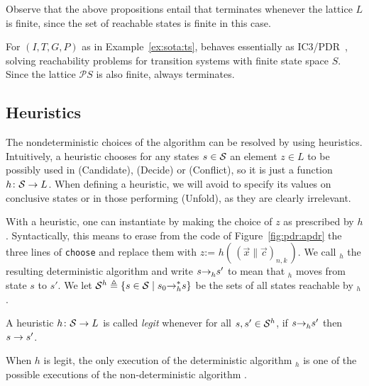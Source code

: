 Observe that the above propositions entail that {\APDR} terminates whenever the lattice $L$ is finite, since the set of reachable states is finite in this case.

\begin{example}
	For $(I,T,G,P)$ as in Example~\ref{ex:sota:ts}, {\APDR} behaves essentially as IC3/PDR~\cite{Bradley11}, solving reachability problems for transition systems with finite state space $S$. Since the lattice $\mathcal{P}S$ is also finite, {\APDR} always terminates.
\end{example}

\subsection{Heuristics}\label{sec:pdr:heuristics}
The nondeterministic choices of the algorithm can be resolved by using heuristics. Intuitively, a heuristic chooses for any states $s\in\mathcal{S}$ an element $z\in L$ to be possibly used in (Candidate), (Decide) or (Conflict), so it is just a function $h\colon \mathcal{S} \to L$.
When defining a heuristic, we will avoid to specify its values on conclusive states or in those performing (Unfold), as they are clearly irrelevant.

With a heuristic, one can instantiate {\APDR} by making the choice of $z$ as prescribed by $h$. Syntactically, this means to erase from the code of Figure~\ref{fig:pdr:apdr} the three lines of \texttt{choose} and replace them with $z \texttt{:= } h(\,( \vec{x} \| \vec{c} )_{n,k}\,)$. We call {\APDR}$_h$ the resulting deterministic algorithm and write $s {\stackrel{}{\to}}_{h}^{} s'$ to mean that {\APDR}$_h$ moves from state $s$ to $s'$. We let $\mathcal{S}^h \triangleq \{s\in \mathcal{S} \mid s_0{\stackrel{}{\to}}_{h}^{*} s\}$ be the sets of all states reachable by {\APDR}$_h$.

\begin{definition}
	A heuristic $h\colon \mathcal{S} \to L$ is called \emph{legit} whenever for all $s,s'\in \mathcal{S}^h$, if $s {\stackrel{}{\to}}_{h}^{}s'$ then $s\stackrel{}{\to}s'$.
\end{definition}
When $h$ is legit, the only execution of the deterministic algorithm {\APDR}$_h$ is one of the possible executions of the non-deterministic algorithm {\APDR}.

